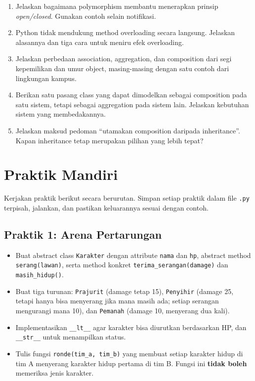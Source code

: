 \begin{enumerate}
  \item Jelaskan bagaimana polymorphism membantu menerapkan prinsip \emph{open/closed}. Gunakan contoh selain notifikasi.
  \item Python tidak mendukung method overloading secara langsung. Jelaskan alasannya dan tiga cara untuk meniru efek overloading.
  \item Jelaskan perbedaan association, aggregation, dan composition dari segi kepemilikan dan umur object, masing-masing dengan satu contoh dari lingkungan kampus.
  \item Berikan satu pasang class yang dapat dimodelkan sebagai composition pada satu sistem, tetapi sebagai aggregation pada sistem lain. Jelaskan kebutuhan sistem yang membedakannya.
  \item Jelaskan maksud pedoman ``utamakan composition daripada inheritance''. Kapan inheritance tetap merupakan pilihan yang lebih tepat?
\end{enumerate}

\section{Praktik Mandiri}

Kerjakan praktik berikut secara berurutan. Simpan setiap praktik dalam file \texttt{.py} terpisah, jalankan, dan pastikan keluarannya sesuai dengan contoh.

\subsection{Praktik 1: Arena Pertarungan}

\begin{itemize}
  \item Buat abstract class \texttt{Karakter} dengan attribute \texttt{nama} dan \texttt{hp}, abstract method \texttt{serang(lawan)}, serta method konkret \texttt{terima\_serangan(damage)} dan \texttt{masih\_hidup()}.
  \item Buat tiga turunan: \texttt{Prajurit} (damage tetap 15), \texttt{Penyihir} (damage 25, tetapi hanya bisa menyerang jika mana masih ada; setiap serangan mengurangi mana 10), dan \texttt{Pemanah} (damage 10, menyerang dua kali).
  \item Implementasikan \texttt{\_\_lt\_\_} agar karakter bisa diurutkan berdasarkan HP, dan \texttt{\_\_str\_\_} untuk menampilkan status.
  \item Tulis fungsi \texttt{ronde(tim\_a, tim\_b)} yang membuat setiap karakter hidup di tim A menyerang karakter hidup pertama di tim B. Fungsi ini \textbf{tidak boleh} memeriksa jenis karakter.
\end{itemize}


